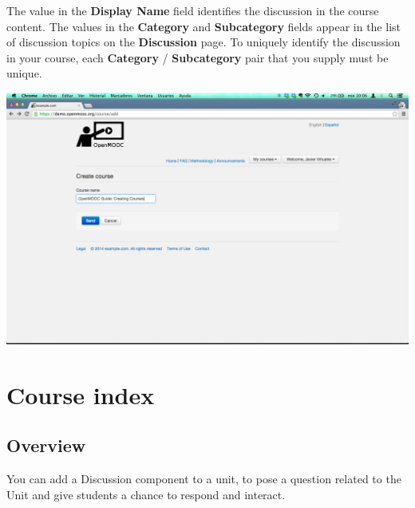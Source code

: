 \documentclass[letterpaper,10pt,english]{sphinxmanual}
\begin{document}
\begin{enumerate}
The value in the \textbf{Display Name} field identifies the discussion in the
course content. The values in the \textbf{Category} and \textbf{Subcategory} fields
appear in the list of discussion topics on the \textbf{Discussion} page. To
uniquely identify the discussion in your course, each \textbf{Category} /
\textbf{Subcategory} pair that you supply must be unique.

\includegraphics{3_create_course-3.png}

\end{enumerate}


\chapter{Course index}
\label{course_index:course-index}\label{course_index::doc}\label{course_index:id1}

\section{Overview}
\label{course_index:overview}
You can add a Discussion component to a unit, to pose a question related to the
Unit and give students a chance to respond and interact.
\end{document}
